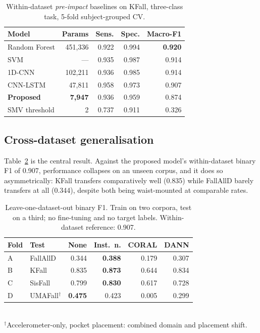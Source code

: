 \documentclass[conference]{IEEEtran}
\begin{document}
\begin{table}[t]
\caption{Within-dataset \emph{pre-impact} baselines on KFall, three-class task,
5-fold subject-grouped CV.}
\label{tab:onebd}
\centering\small
\begin{tabular}{lrrrr}
\toprule
Model & Params & Sens. & Spec. & Macro-F1 \\
\midrule
Random Forest  & 451{,}336 & 0.922 & 0.994 & \textbf{0.920} \\
SVM            & ---       & 0.935 & 0.987 & 0.914 \\
1D-CNN         & 102{,}211 & 0.936 & 0.985 & 0.914 \\
CNN-LSTM       & 47{,}811  & 0.958 & 0.973 & 0.907 \\
\textbf{Proposed} & \textbf{7{,}947} & 0.936 & 0.959 & 0.874 \\
SMV threshold  & 2         & 0.737 & 0.911 & 0.326 \\
\bottomrule
\end{tabular}
\end{table}

\subsection{Cross-dataset generalisation}
\label{sec:c1}

Table~\ref{tab:two} is the central result. Against the proposed model's within-dataset
binary F1 of 0.907, performance collapses on an unseen corpus, and it does so
asymmetrically: KFall transfers comparatively well (0.835) while FallAllD barely
transfers at all (0.344), despite both being waist-mounted at comparable rates.

\begin{table}[t]
\caption{Leave-one-dataset-out binary F1. Train on two corpora, test on a third; no
fine-tuning and no target labels. Within-dataset reference: 0.907.}
\label{tab:two}
\centering\small
\begin{tabular}{llrrrr}
\toprule
Fold & Test & None & Inst.\ n. & CORAL & DANN \\
\midrule
A & FallAllD & 0.344 & \textbf{0.388} & 0.179 & 0.307 \\
B & KFall    & 0.835 & \textbf{0.873} & 0.644 & 0.834 \\
C & SisFall  & 0.799 & \textbf{0.830} & 0.617 & 0.728 \\
D & UMAFall$^\dagger$ & \textbf{0.475} & 0.423 & 0.005 & 0.299 \\
\bottomrule
\end{tabular}
\\[2pt]
{\footnotesize $^\dagger$Accelerometer-only, pocket placement: combined
domain and placement shift.}
\end{table}
\end{document}
